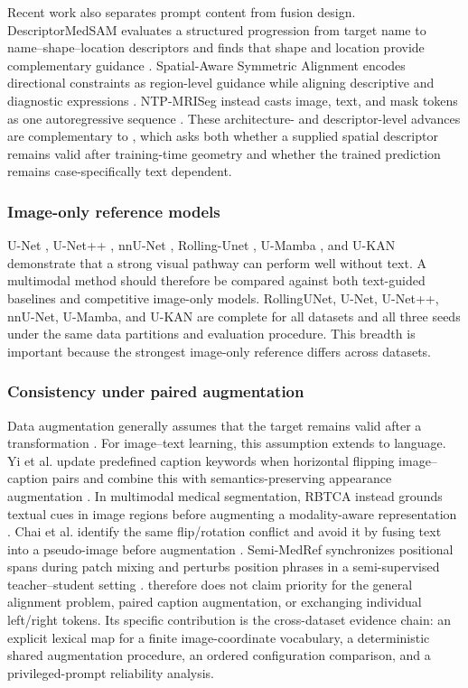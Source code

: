 Recent work also separates prompt content from fusion design. DescriptorMedSAM
evaluates a structured progression from target name to name--shape--location
descriptors and finds that shape and location provide complementary guidance
\cite{descriptormedsam}. Spatial-Aware Symmetric Alignment encodes directional
constraints as region-level guidance while aligning descriptive and diagnostic
expressions \cite{ssa}. NTP-MRISeg instead casts image, text, and mask tokens as
one autoregressive sequence \cite{ntpmriseg}. These architecture- and
descriptor-level advances are complementary to \methodname{}, which asks both
whether a supplied spatial descriptor remains valid after training-time geometry
and whether the trained prediction remains case-specifically text dependent.

\subsubsection{Image-only reference models}
U-Net \cite{unet}, U-Net++ \cite{unetpp}, nnU-Net \cite{nnunet}, Rolling-Unet \cite{rollingunet},
U-Mamba \cite{umamba}, and U-KAN \cite{ukan} demonstrate that a strong visual
pathway can perform well without text. A multimodal method should therefore be
compared against both text-guided baselines and competitive image-only models.
RollingUNet, U-Net, U-Net++, nnU-Net, U-Mamba, and U-KAN are complete for all
datasets and all three seeds under the same data partitions and evaluation
procedure. This breadth is important
because the strongest image-only reference differs across datasets.

\subsubsection{Consistency under paired augmentation}
Data augmentation generally assumes that the target remains valid after a
transformation \cite{shorten2019survey}. For image--text learning, this assumption
extends to language. Yi et al. update predefined caption keywords when
horizontal flipping image--caption pairs and combine this with
semantics-preserving appearance augmentation \cite{augmentpairs}. In multimodal
medical segmentation, RBTCA instead grounds textual cues in image regions before
augmenting a modality-aware representation \cite{rbtca}. Chai et al. identify the same flip/rotation conflict and
avoid it by fusing text into a pseudo-image before augmentation
\cite{chai2025earlyfusion}. Semi-MedRef synchronizes positional spans during
patch mixing and perturbs position phrases in a semi-supervised teacher--student
setting \cite{semimedref}. \methodname{} therefore does not claim priority for the
general alignment problem, paired caption augmentation, or exchanging individual
left/right tokens. Its specific contribution is the cross-dataset evidence chain:
an explicit lexical map for a finite image-coordinate vocabulary, a deterministic
shared augmentation procedure, an ordered configuration comparison, and a
privileged-prompt reliability analysis.


